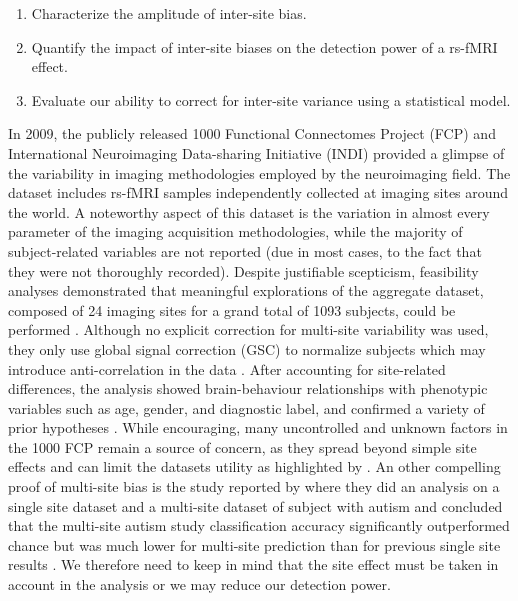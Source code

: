 \documentclass[authoryear]{elsarticle}
\begin{document}
\begin{enumerate}
\item Characterize the amplitude of inter-site bias.
\item Quantify the impact of inter-site biases on the detection power of a rs-fMRI effect.
\item Evaluate our ability to correct for inter-site variance using a statistical model.
\end{enumerate}


In 2009, the publicly released 1000 Functional Connectomes Project (FCP) and International Neuroimaging Data-sharing Initiative (INDI) provided a glimpse of the variability in imaging methodologies employed by the neuroimaging field. The dataset includes rs-fMRI samples independently collected at imaging sites around the world. A noteworthy aspect of this dataset is the variation in almost every parameter of the imaging acquisition methodologies, while the majority of subject-related variables are not reported (due in most cases, to the fact that they were not thoroughly recorded). 
Despite justifiable scepticism, feasibility analyses demonstrated that meaningful explorations of the aggregate dataset, composed of 24 imaging sites for a grand total of 1093 subjects, could be performed \citep{Biswal2010}. Although no explicit correction for multi-site variability was used, they only use global signal correction (GSC) to normalize subjects which may introduce anti-correlation in the data \citep{Fox2009, Murphy2009, Saad2012, Carbonell2014, Power2014}. After accounting for site-related differences, the analysis showed brain-behaviour relationships with phenotypic variables such as age, gender, and diagnostic label, and confirmed a variety of prior hypotheses \citep{Biswal2010, Fair2012, Tomasi2010, Zuo2012}. While encouraging, many uncontrolled and unknown factors in the 1000 FCP remain a source of concern, as they spread beyond simple site effects and can limit the datasets utility as highlighted by \cite{Yan2013}.
An other compelling proof of multi-site bias is the study reported by \cite{Nielsen2013} where they did an analysis on a single site dataset and a multi-site dataset of subject with autism and concluded that the multi-site autism study classification accuracy significantly outperformed chance but was much lower for multi-site prediction than for previous single site results \citep{Nielsen2013}. We therefore need to keep in mind that the site effect must be taken in account in the analysis or we may reduce our detection power.
\end{document}
